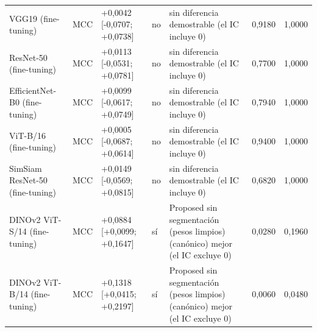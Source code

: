 \begin{longtable}{@{}lllllll@{}}
VGG19 (fine-tuning) & MCC & +0,0042 [-0,0707; +0,0738] & no & sin diferencia demostrable (el IC incluye 0) & 0,9180 & 1,0000 \\
ResNet-50 (fine-tuning) & MCC & +0,0113 [-0,0531; +0,0781] & no & sin diferencia demostrable (el IC incluye 0) & 0,7700 & 1,0000 \\
EfficientNet-B0 (fine-tuning) & MCC & +0,0099 [-0,0617; +0,0749] & no & sin diferencia demostrable (el IC incluye 0) & 0,7940 & 1,0000 \\
ViT-B/16 (fine-tuning) & MCC & +0,0005 [-0,0687; +0,0614] & no & sin diferencia demostrable (el IC incluye 0) & 0,9400 & 1,0000 \\
SimSiam ResNet-50 (fine-tuning) & MCC & +0,0149 [-0,0569; +0,0815] & no & sin diferencia demostrable (el IC incluye 0) & 0,6820 & 1,0000 \\
DINOv2 ViT-S/14 (fine-tuning) & MCC & +0,0884 [+0,0099; +0,1647] & sí & Proposed sin segmentación (pesos limpios) (canónico) mejor (el IC excluye 0) & 0,0280 & 0,1960 \\
DINOv2 ViT-B/14 (fine-tuning) & MCC & +0,1318 [+0,0415; +0,2197] & sí & Proposed sin segmentación (pesos limpios) (canónico) mejor (el IC excluye 0) & 0,0060 & 0,0480 \\
\bottomrule
\end{longtable}
\endgroup

